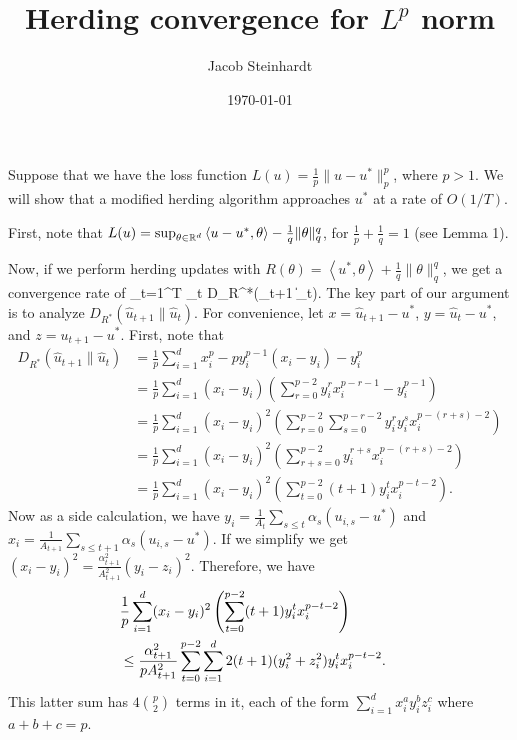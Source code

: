 \documentclass[reqno,oneside,a4paper]{amsart}
\newcommand{\ip}[2]{\left\langle #1, #2 \right\rangle}
\def\[#1\]{\begin{align}#1\end{align}}
\begin{document}
\title{Herding convergence for $L^p$ norm} 
\author{Jacob Steinhardt}
\date{\today}

\maketitle

Suppose that we have the loss function $L(u) = \frac{1}{p} \|u-u^*\|_p^p$, where $p > 1$. 
We will show that a modified herding algorithm approaches $u^*$ at a rate of $O(1/T)$.

First, note that $L(u) = \sup_{\theta \in \bR^d} \ip{u-u^*}{\theta} - \frac{1}{q} \|\theta\|_q^q$, 
for $\frac{1}{p} + \frac{1}{q} = 1$ (see Lemma 1).

Now, if we perform herding updates with $R(\theta) = \ip{u^*}{\theta} + \frac{1}{q}\|\theta\|_q^q$, we 
get a convergence rate of
\[ \sum_{t=1}^T \alpha_t D_{R^*}(_{t+1} \| _t). \]
The key part of our argument is to analyze $D_{R^*}(\hat{u}_{t+1} \| \hat{u}_t)$. For convenience, 
let $x = \hat{u}_{t+1}-u^*$, $y = \hat{u}_t-u^*$, and $z = u_{t+1}-u^*$.
First, note that 
\begin{align*}
D_{R^*}(\hat{u}_{t+1} \| \hat{u}_t) &= \frac{1}{p} \sum_{i=1}^d x_i^p-py_i^{p-1}(x_i-y_i)-y_i^p \\
 &= \frac{1}{p} \sum_{i=1}^d (x_i-y_i)\left(\sum_{r=0}^{p-2} y_i^rx_i^{p-r-1}-y_i^{p-1}\right) \\
 &= \frac{1}{p} \sum_{i=1}^d (x_i-y_i)^2 \left(\sum_{r=0}^{p-2} \sum_{s=0}^{p-r-2} y_i^ry_i^sx_i^{p-(r+s)-2}\right) \\
 &= \frac{1}{p} \sum_{i=1}^d (x_i-y_i)^2 \left(\sum_{r+s=0}^{p-2} y_i^{r+s}x_i^{p-(r+s)-2}\right) \\
 &= \frac{1}{p} \sum_{i=1}^d (x_i-y_i)^2 \left(\sum_{t=0}^{p-2} (t+1)y_i^{t}x_i^{p-t-2}\right).
\end{align*}
Now as a side calculation, we have $y_i = \frac{1}{A_t}\sum_{s \leq t} \alpha_s (u_{i,s}-u^*)$ 
and $x_i = \frac{1}{A_{t+1}} \sum_{s \leq t+1} \alpha_s (u_{i,s}-u^*)$. If we simplify we get
$(x_i-y_i)^2 = \frac{\alpha_{t+1}^2}{A_{t+1}^2} (y_i-z_i)^2$. Therefore, we have
\begin{align*}
\lefteqn{\frac{1}{p} \sum_{i=1}^d (x_i-y_i)^2 \left(\sum_{t=0}^{p-2} (t+1)y_i^{t}x_i^{p-t-2}\right)} \\
 &\leq \frac{\alpha_{t+1}^2}{p A_{t+1}^2} \sum_{t=0}^{p-2} \sum_{i=1}^d 2(t+1)(y_i^2+z_i^2)y_i^{t}x_i^{p-t-2}.
\end{align*}
This latter sum has $4\binom{p}{2}$ terms in it, each of the form $\sum_{i=1}^d x_i^ay_i^bz_i^c$ where $a+b+c=p$. 
\end{document}
